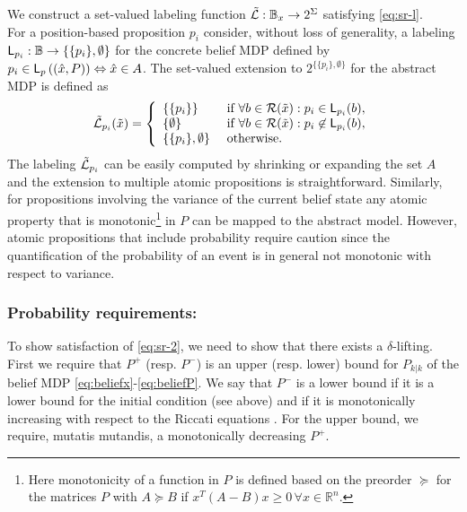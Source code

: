 \documentclass{ifacconf}
\begin{document}
We construct a set-valued labeling function  $\tilde {\mathcal{L}}: \mathbb{B}_{x}\rightarrow 2^\Sigma$ satisfying \eqref{eq:sr-l}.
\\
For a position-based proposition $p_i$ consider, without loss of generality, a labeling $\mathsf{L}_{p_i}: \mathbb{B}\rightarrow \{\{p_i\},\emptyset\}$ for the concrete belief MDP defined by $p_i\in\mathsf{L}_p \left( (\hat x,P) \right)  \Leftrightarrow \hat x \in A$. The set-valued extension to $2^{\{\{p_i\},\emptyset\}}$ for the abstract MDP is defined as
 \begin{align}
 	\tilde {\mathcal{L}}_{p_i}(\tilde x) =\left\{\begin{array}{ll} \{\{p_i\}\} & \mbox{ if } \forall b \in \mathcal{R} (\tilde x):p_i\in\mathsf{L}_{p_i}(b), \\
 	  \{\emptyset \} & \mbox{ if } \forall b\in \mathcal{R} (\tilde x):{p_i}\not\in\mathsf{L}_{p_i}(b),\\
 	  \{\{p_i\},\emptyset\}&\mbox{ otherwise.}\end{array} \right.
 \end{align}
The labeling $\tilde {\mathcal{L}}_{p_i}$ can be easily computed by shrinking or expanding the set $A$ and the extension to multiple atomic propositions is straightforward. Similarly, for propositions involving the variance of the current belief state any atomic property that is monotonic\footnote{Here monotonicity of a function in $P$ is defined based on the preorder $\succeq $ for the matrices $P$ with $A\succeq B$ if $x^T(A-B)x\geq0\, \forall x\in\mathbb R^n$. } in $P$ can be mapped to the abstract model. However, atomic propositions that include probability require caution since the quantification of the probability of an event is in general not monotonic with respect to variance.


\subsubsection{Probability requirements:}
To show satisfaction of \eqref{eq:sr-2}, we need to show that there exists a $\delta$-lifting. First we require that $P^+$ (resp. $P^-$) is an upper (resp. lower) bound for $P_{k|k}$ of the belief MDP \eqref{eq:beliefx}-\eqref{eq:beliefP}.  We say that $P^-$ is a lower bound if it is a lower bound for the initial condition (see above) and   if it is monotonically increasing with respect to the Riccati equations \citep{bitmead1985monotonicity}. For the upper bound, we require, mutatis mutandis, a monotonically decreasing $P^+$.
\end{document}
